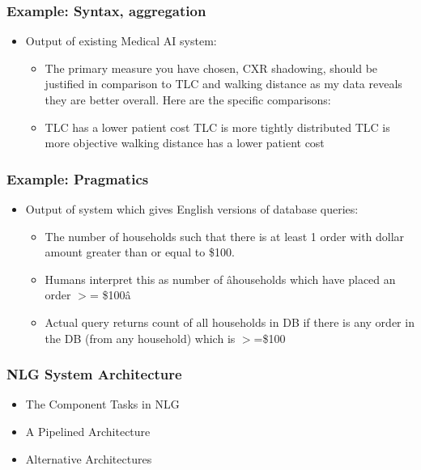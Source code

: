 \documentclass[compress,color=usenames]{beamer}
\begin{document}
\begin{frame}
\frametitle{Example: Syntax, aggregation}

\label{f48}
\begin{itemize}
\item { {Output of existing Medical AI system:}}
\begin{itemize}
\item The primary measure you have chosen, CXR shadowing, should be justified in comparison to TLC and walking distance as my data reveals they are better overall. Here are the specific comparisons:
\item TLC has a lower patient cost TLC is more tightly distributed TLC is more objective walking distance has a lower patient cost
\end{itemize}
\end{itemize}

\end{frame}

\begin{frame}
\frametitle{Example: Pragmatics}

\label{f50}
\begin{itemize}
\item { {Output of system which gives English versions of database queries:}}
\begin{itemize}
\item The number of households such that there is at least 1 order with dollar amount greater than or equal to \$100.
\item Humans interpret this as number of \^ahouseholds which have placed an order \mbox{$>$}= \$100\^a
\item Actual query returns count of all households in DB if there is any order in the DB (from any household) which is \mbox{$>$}=\$100
\end{itemize}
\end{itemize}

\end{frame}

\begin{frame}
\frametitle{NLG System Architecture}

\label{f52}
\begin{itemize}
\item { {The Component Tasks in NLG}}
\item { {A Pipelined Architecture}}
\item { {Alternative Architectures}}
\end{itemize}

\end{frame}
\end{document}
